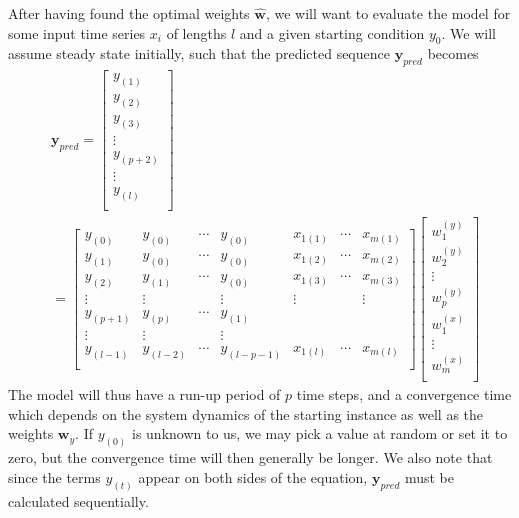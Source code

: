 \documentclass[]{article}
\begin{document}
After having found the optimal weights $\hat{\mathbf{w}}$, we will want to evaluate the model for some input time series $x_i$ of lengths $l$ and a given starting condition $y_0$. We will assume steady state initially, such that the predicted sequence $\mathbf{y}_{pred}$ becomes
\begin{equation}
\begin{aligned}
	&\mathbf{y}_{pred} = 
	\left[ 
\begin{array}{c}
	y_{(1)}	\\
	y_{(2)}	\\
	y_{(3)}	\\
	\vdots  \\
	y_{(p+2)}	\\
	\vdots  \\
	y_{(l)}	\\
\end{array}
\right]
	 \\
	&= \left[ 
		\begin{array}{ccccccc}
			y_{(0)} & y_{(0)} & \cdots & y_{(0)} & x_{1(1)} & \cdots &  x_{m(1)} \\
			y_{(1)} & y_{(0)} & \cdots & y_{(0)} & x_{1(2)} & \cdots &  x_{m(2)} \\	
			y_{(2)} & y_{(1)} & \cdots & y_{(0)} & x_{1(3)} & \cdots &  x_{m(3)} \\
			\vdots  & \vdots  &        & \vdots  & \vdots   &        &  \vdots   \\
			y_{(p+1)} & y_{(p)} & \cdots & y_{(1)}  \\
			\vdots  & \vdots  &        & \vdots     \\
			y_{(l-1)} & y_{(l-2)} & \cdots & y_{(l-p-1)} & x_{1(l)} & \cdots &  x_{m(l)} \\			
		\end{array}
	\right]
	\left[ 
\begin{array}{c}
w^{(y)}_1 \\
w^{(y)}_2 \\
\vdots \\
w^{(y)}_p \\
w^{(x)}_1 \\
\vdots \\
w^{(x)}_m \\
\end{array}
\right]	
\end{aligned}
\end{equation}
The model will thus have a run-up period of $p$ time steps, and a convergence time which depends on the system dynamics of the starting instance as well as the weights $\mathbf{w}_y$. If $y_{(0)}$ is unknown to us, we may pick a value at random or set it to zero, but the convergence time will then generally be longer. We also note that since the terms $y_{(t)}$ appear on both sides of the equation, $\mathbf{y}_{pred}$ must be calculated sequentially. 
\end{document}
